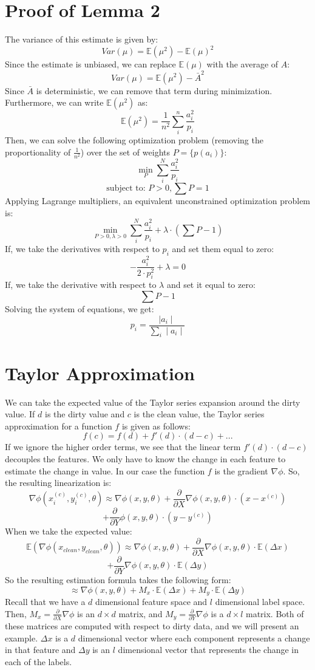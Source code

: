 \section{Proof of Lemma 2}\label{impsample-deriv}
The variance of this estimate is given by:
\[
Var(\mu) = \mathbb{E}(\mu^2)-\mathbb{E}(\mu)^2
\] 
Since the estimate is unbiased, we can replace $\mathbb{E}(\mu)$ with the average of $A$:
\[
Var(\mu) = \mathbb{E}(\mu^2)-\bar{A}^2
\]
Since $\bar{A}$ is deterministic, we can remove that term during minimization.
Furthermore, we can write $\mathbb{E}(\mu^2)$ as:
\[
\mathbb{E}(\mu^2) = \frac{1}{n^2}\sum_i^n \frac{a_i^2}{p_i}
\]
Then, we can solve the following optimization problem (removing the proportionality of $\frac{1}{n^2}$) over the set of weights $P=\{p(a_i)\}$:
\[
\min_{P} \sum_i^N \frac{a_i^2}{p_i}
\]
\[
\text{subject to: } P > 0, \sum P = 1
\]
Applying Lagrange multipliers, an equivalent unconstrained optimization problem is:
\[
\min_{P > 0,\lambda > 0} \sum_i^N \frac{a_i^2}{p_i} + \lambda \cdot (\sum P - 1)
\]
If, we take the derivatives with respect to $p_i$ and set them equal to zero:
\[
-\frac{a_i^2}{2 \cdot p_i^2} + \lambda = 0
\]
If, we take the derivative with respect to $\lambda$ and set it equal to zero:
\[
\sum P - 1
\]
Solving the system of equations, we get:
\[
p_i = \frac{\mid a_i \mid }{\sum_i \mid a_i \mid}
\]

\section{Taylor Approximation}\label{taylor-deriv}
We can take the expected value of the Taylor series expansion around the dirty value.
If $d$ is the dirty value and $c$ is the clean value, the Taylor series approximation for a function $f$ is given as follows:
\[
f(c) = f(d) + f'(d)\cdot(d-c) + ...
\]
If we ignore the higher order terms, we see that the linear term $f'(d)\cdot(d-c)$ decouples the features.
We only have to know the change in each feature to estimate the change in value.
In our case the function $f$ is the gradient $\nabla\phi$.
So, the resulting linearization is:
\[
\nabla\phi(x^{(c)}_i,y^{(c)}_i,\theta) \approx \nabla\phi(x,y,\theta) + \frac{\partial}{\partial X}\nabla\phi(x,y,\theta)\cdot (x - x^{(c)}) \]
\[+ \frac{\partial}{\partial Y}\phi(x,y,\theta)\cdot (y - y^{(c)})
\]
When we take the expected value:
\[
\mathbb{E}(\nabla\phi(x_{clean},y_{clean},\theta)) \approx \nabla\phi(x,y,\theta) + \frac{\partial}{\partial X}\nabla\phi(x,y,\theta)\cdot \mathbb{E}(\Delta x) \]
\[+ \frac{\partial}{\partial Y}\nabla\phi(x,y,\theta)\cdot \mathbb{E}(\Delta y)
\]
So the resulting estimation formula takes the following form:
\[
\approx \nabla\phi(x,y,\theta) + M_x \cdot \mathbb{E}(\Delta x) + M_y \cdot \mathbb{E}(\Delta y)
\]
Recall that we have a $d$ dimensional feature space and $l$ dimensional label space.
Then, $M_x = \frac{\partial}{\partial X}\nabla\phi$ is an $d \times d$ matrix, and $M_y = \frac{\partial}{\partial Y}\nabla\phi$ is a $d \times l$ matrix.
Both of these matrices are computed with respect to dirty data, and we will present an example.
$\Delta x$ is a $d$ dimensional vector where each component represents a change in that feature and $\Delta y$ is an $l$ dimensional vector that represents the change in each of the labels.

